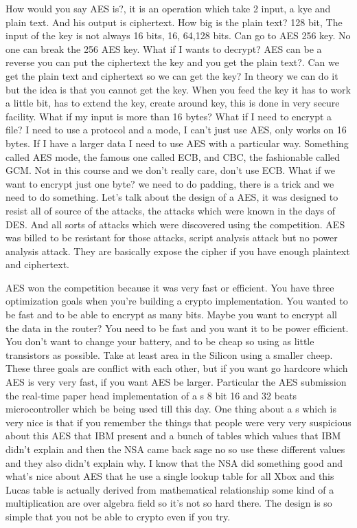 How would you say AES is?, it is an operation which take 2 input, a kye and
plain text. And his output is ciphertext. How big is the plain text? 128 bit,
The input of the key is not always 16 bits, 16, 64,128 bits. Can go to AES 256
key. No one can break the 256 AES key. What if I wants to decrypt? AES can be a
reverse you can put the ciphertext the key and you get the plain text?. Can we
get the plain text and ciphertext so we can get the key? In theory we can do it
but the idea is that you cannot get the key. When you feed the key it has to
work a little bit, has to extend the key, create around key, this is done in
very secure facility. What if my input is more than 16 bytes? What if I need to
encrypt a file? I need to use a protocol and a mode, I can't just use AES, only
works on 16 bytes. If I have a larger data I need to use AES with a particular
way. Something called AES mode, the famous one called ECB, and CBC, the
fashionable called GCM. Not in this course and we don't really care, don't use
ECB. What if we want to encrypt just one byte? we need to do padding, there is a
trick and we need to do something. Let's talk about the design of a AES, it was
designed to resist all of source of the attacks, the attacks which were known in
the days of DES. And all sorts of attacks which were discovered using the
competition. AES was billed to be resistant for those attacks, script analysis
attack but no power analysis attack. They are basically expose the cipher if you
have enough plaintext and ciphertext.
 
AES won the competition because it was very fast or efficient. You have three
optimization goals when you're building a crypto implementation. You wanted to
be fast and to be able to encrypt as many bits. Maybe you want to encrypt all
the data in the router? You need to be fast and you want it to be power
efficient. You don't want to change your battery, and to be cheap so using as
little transistors as possible. Take at least area in the Silicon using a
smaller cheep. These three goals are conflict with each other, but if you want
go hardcore which AES is very very fast, if you want AES be larger. Particular
the AES submission the real-time paper head implementation of a s 8 bit 16 and
32 beats microcontroller which be being used till this day. One thing about a s
which is very nice is that if you remember the things that people were very very
suspicious about this AES that IBM present and a bunch of tables which values
that IBM didn't explain and then the NSA came back sage no so use these
different values and they also didn't explain why. I know that the NSA did
something good and what's nice about AES that he use a single lookup table for
all Xbox and this Lucas table is actually derived from mathematical relationship
some kind of a multiplication are over algebra field so it's not so hard there.
The design is so simple that you not be able to crypto even if you try. 

